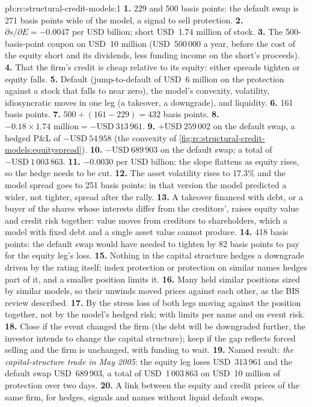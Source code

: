 \begin{solution}{pb:rc:structural-credit-models:1}
\textbf{1.} 229 and 500 basis points: the default swap is 271 basis points wide of the
model, a signal to sell protection.
\textbf{2.} $\partial s/\partial E = -0.0047$ per USD billion; short USD~1.74 million of
stock.
\textbf{3.} The 500-basis-point coupon on USD~10 million (USD~500\,000 a year, before the
cost of the equity short and its dividends, less funding income on the short's proceeds).
\textbf{4.} That the firm's credit is cheap relative to its equity: either spreads tighten
or equity falls.
\textbf{5.} Default (jump-to-default of USD~6 million on the protection against a stock
that falls to near zero), the model's convexity, volatility, idiosyncratic moves in one
leg (a takeover, a downgrade), and liquidity.
\textbf{6.} 161 basis points.
\textbf{7.} $500+(161-229) = 432$ basis points.
\textbf{8.} $-0.18\times1.74 \text{ million} = -\text{USD}~313\,961$.
\textbf{9.} $+\text{USD}~259\,002$ on the default swap, a hedged P\&L of $-\text{USD}~54\,958$
(the convexity of \cref{fig:rc:structural-credit-models:equityspread}).
\textbf{10.} $-\text{USD}~689\,903$ on the default swap; a total of $-\text{USD}~1\,003\,863$.
\textbf{11.} $-0.0030$ per USD billion: the slope flattens as equity rises, so the hedge
needs to be cut.
\textbf{12.} The asset volatility rises to 17.3\% and the model spread goes to 251 basis
points: in that version the model predicted a wider, not tighter, spread after the rally.
\textbf{13.} A takeover financed with debt, or a buyer of the shares whose interests differ
from the creditors', raises equity value and credit risk together: value moves from
creditors to shareholders, which a model with fixed debt and a single asset value cannot
produce.
\textbf{14.} 418 basis points: the default swap would have needed to tighten by 82 basis
points to pay for the equity leg's loss.
\textbf{15.} Nothing in the capital structure hedges a downgrade driven by the rating
itself; index protection or protection on similar names hedges part of it, and a smaller
position limits it.
\textbf{16.} Many held similar positions sized by similar models, so their unwinds moved
prices against each other, as the BIS review described.
\textbf{17.} By the stress loss of both legs moving against the position together, not by the
model's hedged risk; with limits per name and on event risk.
\textbf{18.} Close if the event changed the firm (the debt will be downgraded further, the
investor intends to change the capital structure); keep if the gap reflects forced
selling and the firm is unchanged, with funding to wait.
\textbf{19.} Named result: \emph{the capital-structure trade in May 2005}: the equity leg
loses USD~313\,961 and the default swap USD~689\,903, a total of USD~1\,003\,863 on
USD~10 million of protection over two days.
\textbf{20.} A link between the equity and credit prices of the same firm, for hedges,
signals and names without liquid default swaps.
\end{solution}

